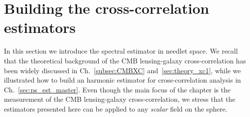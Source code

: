 \section{Building the cross-correlation estimators}
\label{sec:theo}
In this section we introduce the spectral estimator in needlet space. We recall that the theoretical background of the \gls{CMB} lensing-galaxy cross-correlation has been widely discussed in Ch.~\eqref{subsec:CMBXC} and~\eqref{sec:theory_xc1}, while we illustrated how to build an harmonic estimator for cross-correlation analysis in Ch.~\eqref{sec:ps_est_master}. Even though
the main focus of the chapter is the measurement of the CMB lensing-galaxy cross-correlation,
we stress that the estimators presented here can be applied to any \textit{scalar} field on the sphere.
%
%
